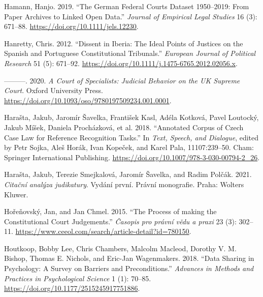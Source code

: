 \documentclass[
  11pt,
]{article}
\newlength{\cslhangindent}
\newenvironment{CSLReferences}[2] %
 {%
  \setlength{\parindent}{0pt}
  \ifodd #1 \everypar{\setlength{\hangindent}{\cslhangindent}}\ignorespaces\fi
  \ifnum #2 > 0
  \setlength{\parskip}{#2\baselineskip}
  \fi
 }%
 {}
\begin{document}
\begin{CSLReferences}{1}{0}
\leavevmode{}%
Hamann, Hanjo. 2019. {``The {German Federal Courts Dataset} 1950--2019:
{From Paper Archives} to {Linked Open Data}.''} \emph{Journal of
Empirical Legal Studies} 16 (3): 671--88.
\url{https://doi.org/10.1111/jels.12230}.

\leavevmode{}%
Hanretty, Chris. 2012. {``Dissent in {Iberia}: {The} Ideal Points of
Justices on the {Spanish} and {Portuguese Constitutional Tribunals}.''}
\emph{European Journal of Political Research} 51 (5): 671--92.
\url{https://doi.org/10.1111/j.1475-6765.2012.02056.x}.

\leavevmode{}%
---------. 2020. \emph{A {Court} of {Specialists}: {Judicial Behavior}
on the {UK Supreme Court}}. {Oxford University Press}.
\url{https://doi.org/10.1093/oso/9780197509234.001.0001}.

\leavevmode{}%
Harašta, Jakub, Jaromír Šavelka, František Kasl, Adéla Kotková, Pavel
Loutocký, Jakub Míšek, Daniela Procházková, et al. 2018. {``Annotated
{Corpus} of {Czech Case Law} for {Reference Recognition Tasks}.''} In
\emph{Text, {Speech}, and {Dialogue}}, edited by Petr Sojka, Aleš Horák,
Ivan Kopeček, and Karel Pala, 11107:239--50. {Cham}: {Springer
International Publishing}.
\url{https://doi.org/10.1007/978-3-030-00794-2_26}.

\leavevmode{}%
Harašta, Jakub, Terezie Smejkalová, Jaromír Šavelka, and Radim Polčák.
2021. \emph{Citační analýza judikatury}. Vydání první. Právní
monografie. {Praha}: {Wolters Kluwer}.

\leavevmode{}%
Hořeňovský, Jan, and Jan Chmel. 2015. {``The Process of making the
Constitutional Court Judgements.''} \emph{Časopis pro právní vědu a
praxi} 23 (3): 302--11.
\url{https://www.ceeol.com/search/article-detail?id=780150}.

\leavevmode{}%
Houtkoop, Bobby Lee, Chris Chambers, Malcolm Macleod, Dorothy V. M.
Bishop, Thomas E. Nichols, and Eric-Jan Wagenmakers. 2018. {``Data
{Sharing} in {Psychology}: {A Survey} on {Barriers} and
{Preconditions}.''} \emph{Advances in Methods and Practices in
Psychological Science} 1 (1): 70--85.
\url{https://doi.org/10.1177/2515245917751886}.


\end{CSLReferences}
\end{document}
